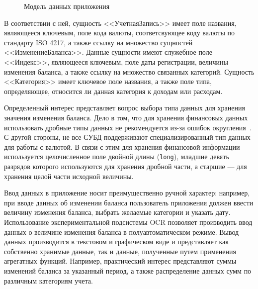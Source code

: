 \begin{figure}[h!]
  \centering
  \caption{Модель данных приложения}
  \label{fig:design_entities}
\end{figure}

В соответствии с ней, сущность <<УчетнаяЗапись>> имеет поле названия,
являющееся ключевым, поле кода валюты, соответсвующее коду валюты по
стандарту ISO 4217, а также ссылку на множество сущностей
<<ИзменениеБаланса>>. Данные сущности имеют служебное поле <<Индекс>>,
являющееся ключевым, поле даты регистрации, величины изменения баланса,
а также ссылку на множество связанных категорий.
Сущность <<Категория>> имеет ключевое поле названия, а также поле типа,
определяющее, относится ли данная категория к доходам или расходам.

Определенный интерес представляет вопрос выбора типа данных для хранения
значения изменения баланса. Дело в том, что для хранения финансовых данных
использовать дробные типы данных не рекомендуется
из-за ошибок округления~\cite{bloch08}. С другой стороны, не все СУБД
поддерживают специализированный тип данных для работы с валютой.
В связи с этим для хранения финансовой информации используется целочисленное
поле двойной длины (\texttt{long}), младшие девять разрядов которого используются
для хранения дробной части, а старшие --- для хранения целой части
исходной величины.

Ввод данных в приложение носит преимущественно ручной характер:
например, при вводе данных об изменении баланса
пользователь приложения должен ввести величину изменения баланса,
выбрать желаемые категории и указать дату.
Использование экспериментальной подсистемы OCR позволяет производить
ввод данных о величине изменения баланса в полуавтоматическом режиме.
Вывод данных производится в текстовом и графическом виде и
представляет как собственно хранимые данные, так и данные, полученные путем
применения агрегатных функций. Например, практический интерес представляют
суммы изменений баланса за указанный период, а также распределение
данных сумм по различным категориям учета.



